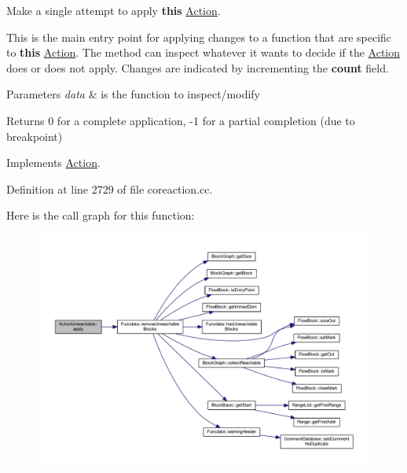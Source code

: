 Make a single attempt to apply {\bfseries{this}} \mbox{\hyperlink{class_action}{Action}}. 

This is the main entry point for applying changes to a function that are specific to {\bfseries{this}} \mbox{\hyperlink{class_action}{Action}}. The method can inspect whatever it wants to decide if the \mbox{\hyperlink{class_action}{Action}} does or does not apply. Changes are indicated by incrementing the {\bfseries{count}} field. 
\begin{DoxyParams}{Parameters}
{\em data} & is the function to inspect/modify \\
\hline
\end{DoxyParams}
\begin{DoxyReturn}{Returns}
0 for a complete application, -\/1 for a partial completion (due to breakpoint) 
\end{DoxyReturn}


Implements \mbox{\hyperlink{class_action_aac1c3999d6c685b15f5d9765a4d04173}{Action}}.



Definition at line 2729 of file coreaction.\+cc.

Here is the call graph for this function\+:
\nopagebreak
\begin{figure}[H]
\begin{center}
\leavevmode
\includegraphics[width=350pt]{class_action_unreachable_a9dd250eba93553aad31aa38168d7c301_cgraph}
\end{center}
\end{figure}
\mbox{\label{class_action_unreachable_a75b11d02821280b8ae5b02fcc082a13a}} 

